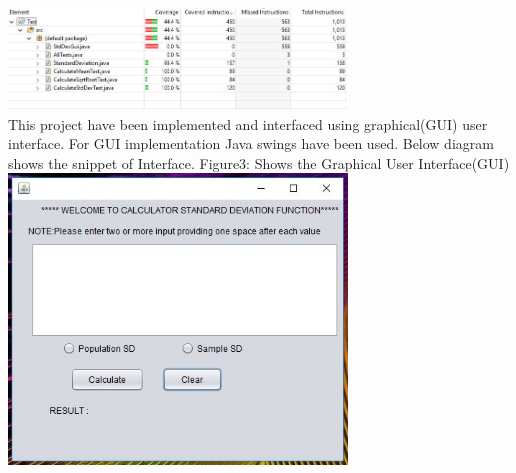 \documentclass[a4paper,12pt]{article}
\begin{document}
\begin{titlepage}
\newline
\includegraphics[width=9.0cm]{Coverage.JPG}\\
\newline
This project have been implemented and interfaced using graphical(GUI) user interface. For GUI implementation Java swings have been used. Below diagram shows the snippet of Interface. 
Figure3: Shows the Graphical User Interface(GUI) \\
\newline
\includegraphics[width=9.0cm]{GUI.JPG}\\
\newline






\end{titlepage}
\end{document}

